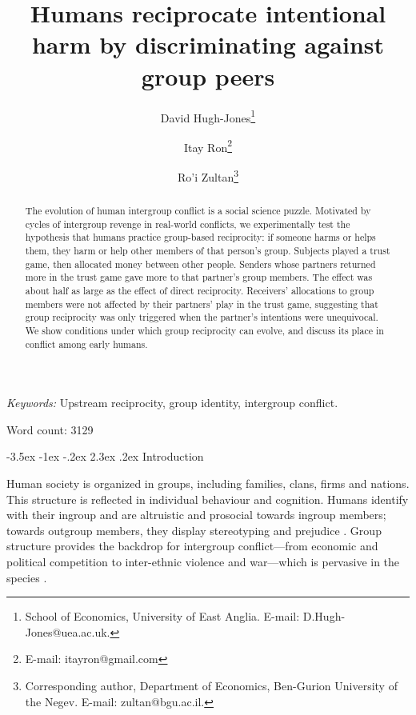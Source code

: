 \documentclass[12pt,a4paper]{article}\usepackage[]{graphicx}\usepackage[]{color}
\title{\bf\sffamily Humans reciprocate intentional harm by discriminating against group peers}
\author{David Hugh-Jones\thanks{School of Economics, University of East Anglia. E-mail: D.Hugh-Jones@uea.ac.uk.} \and Itay Ron\thanks{E-mail: itayron@gmail.com} \and Ro'i Zultan\thanks{Corresponding author, Department of Economics, Ben-Gurion University of the Negev. E-mail: zultan@bgu.ac.il.}}
\date{}%
\makeatletter
\renewcommand\section{\@startsection {section}{1}{\z@}%
{-3.5ex \@plus -1ex \@minus -.2ex}%
{2.3ex \@plus.2ex}%
{\bf\sffamily\Large}}
\makeatother
\begin{document}
\maketitle

\begin{abstract}
The evolution of human intergroup conflict is a social science puzzle. 
Motivated by cycles of intergroup revenge in real-world conflicts, we experimentally
test the hypothesis that humans practice group-based reciprocity: if someone
harms or helps them, they harm or help other members of that person's group.
Subjects played a trust game, then allocated money between other people. Senders
whose partners returned more in the trust game gave more to that partner's group
members. The effect was about half as large as the effect of direct reciprocity.
Receivers' allocations to group members were not affected by their partners’ 
play in the trust game, suggesting that group reciprocity was only triggered when the
partner's intentions were unequivocal. We show conditions under which group 
reciprocity can evolve, and discuss its place in conflict among early humans.
\end{abstract}

\emph{Keywords:} Upstream reciprocity, group identity, intergroup conflict.

Word count: 3129



\newpage

\section{Introduction}

Human society is organized in groups, including families, clans, firms and nations. This
structure is reflected in individual behaviour and cognition. Humans identify
with their ingroup and are altruistic and prosocial towards ingroup members;
towards outgroup members, they display stereotyping and prejudice
\citep{tajfel1979integrative,yamagishi2000thegroup,balliet2014ingroup,DeDreu2014,chen2009group,chen2011potential}.
Group structure provides the backdrop for intergroup conflict---from economic
and political competition to inter-ethnic violence and war---which is pervasive
in the species \citep{world_bank_world_2011}.
\end{document}
